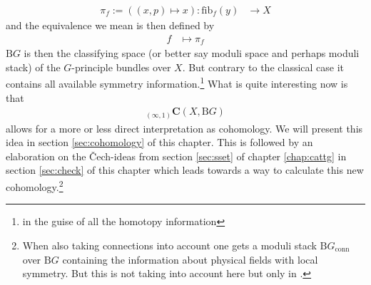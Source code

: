 \begin{align*}
  \pi_{f}
  :=
  \left(
    (x,p)
    \mapsto
    x
  \right)
  \colon
  \mathrm{fib}_{f}(y)
  &\rightarrow
  X
\end{align*}
and the equivalence we mean is then defined by
\begin{align*}
  f
  &\mapsto
  \pi_{f}
\end{align*}
$\mathrm{B}G$ is then the classifying space (or better say moduli space and perhaps moduli stack) of the $G$-principle bundles over $X$. But contrary to the classical case it contains all available symmetry information.\footnote{in the guise of all the homotopy information} What is quite interesting now is that
\begin{align*}
  {}_{(\infty,1)}\mathbf{C}
  \left(
    X,
    \mathrm{B}G
  \right)
\end{align*}
allows for a more or less direct interpretation as cohomology. We will present this idea in section \ref{sec:cohomology} of this chapter. This is followed by an elaboration on the {\glqq}\v{C}ech-ideas{\grqq} from section \ref{sec:sset} of chapter \ref{chap:cattg} in section \ref{sec:check} of this chapter which leads towards a way to {\glqq}calculate{\grqq} this new cohomology.\footnote{When also taking connections into account one gets a moduli stack $\mathrm{B}G_{\textrm{conn}}$ {\glqq}over{\grqq} $\mathrm{B}G$ containing the information about physical fields with local symmetry. But this is not taking into account here but only in \cite{a565d200}.}
